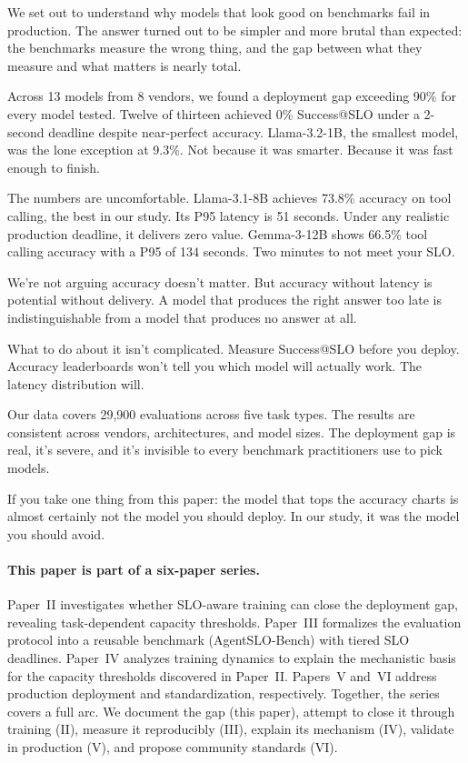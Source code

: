 \documentclass[11pt]{article}
\begin{document}
We set out to understand why models that look good on benchmarks fail in production.  The answer turned out to be simpler and more brutal than expected: the benchmarks measure the wrong thing, and the gap between what they measure and what matters is nearly total.

Across 13 models from 8 vendors, we found a deployment gap exceeding 90\% for every model tested.  Twelve of thirteen achieved 0\% Success@SLO under a 2-second deadline despite near-perfect accuracy.  Llama-3.2-1B, the smallest model, was the lone exception at 9.3\%.  Not because it was smarter.  Because it was fast enough to finish.

The numbers are uncomfortable.  Llama-3.1-8B achieves 73.8\% accuracy on tool calling, the best in our study.  Its P95 latency is 51 seconds.  Under any realistic production deadline, it delivers zero value.  Gemma-3-12B shows 66.5\% tool calling accuracy with a P95 of 134 seconds.  Two minutes to not meet your SLO.

We're not arguing accuracy doesn't matter.  But accuracy without latency is potential without delivery.  A model that produces the right answer too late is indistinguishable from a model that produces no answer at all.

What to do about it isn't complicated.  Measure Success@SLO before you deploy.  Accuracy leaderboards won't tell you which model will actually work.  The latency distribution will.

Our data covers 29,900 evaluations across five task types.  The results are consistent across vendors, architectures, and model sizes.  The deployment gap is real, it's severe, and it's invisible to every benchmark practitioners use to pick models.

If you take one thing from this paper: the model that tops the accuracy charts is almost certainly not the model you should deploy.  In our study, it was the model you should avoid.

\paragraph{This paper is part of a six-paper series.}
Paper~II investigates whether SLO-aware training can close the deployment gap, revealing task-dependent capacity thresholds.
Paper~III formalizes the evaluation protocol into a reusable benchmark (AgentSLO-Bench) with tiered SLO deadlines.
Paper~IV analyzes training dynamics to explain the mechanistic basis for the capacity thresholds discovered in Paper~II.
Papers~V and~VI address production deployment and standardization, respectively.
Together, the series covers a full arc.  We document the gap (this paper), attempt to close it through training (II), measure it reproducibly (III), explain its mechanism (IV), validate in production (V), and propose community standards (VI).
\end{document}
